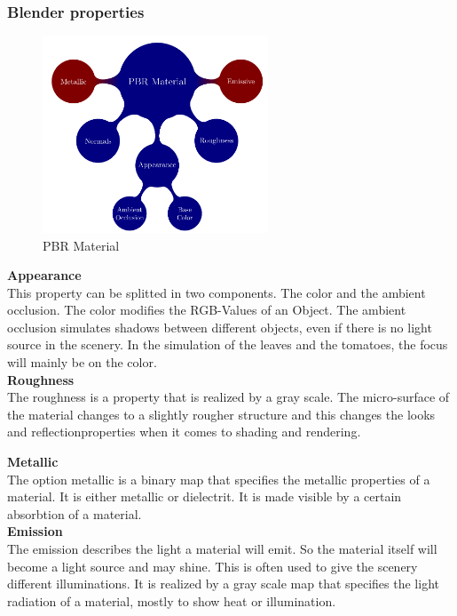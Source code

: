 \subsubsection*{Blender properties}
\begin{figure}[h]
	\centering
	\includegraphics[width=0.6\textwidth]{blender_properties.png}
	\caption{PBR Material}
	\label{pbr}
\end{figure}
\textbf{Appearance}\\
This property can be splitted in two components. The color and the ambient occlusion. The color modifies the RGB-Values of an Object. The ambient occlusion simulates shadows between different objects, even if there is no light source in the scenery. In the simulation of the leaves and the tomatoes, the focus will mainly be on the color.\\

\textbf{Roughness}\\
The roughness is a property that is realized by a gray scale. The micro-surface of the material changes to a slightly rougher structure and this changes the looks and reflectionproperties when it comes to shading and rendering. \newline

\textbf{Metallic}\\
The option metallic is a binary map that specifies the metallic properties of a material. It is either metallic or dielectrit. It is made visible by a certain absorbtion of a material.\\


\textbf{Emission} \\
The emission describes the light a material will emit. So the material itself will become a light source and may shine. This is often used to give the scenery different illuminations. It is realized by a gray scale map that specifies the light radiation of a material, mostly to show heat or illumination.\\


